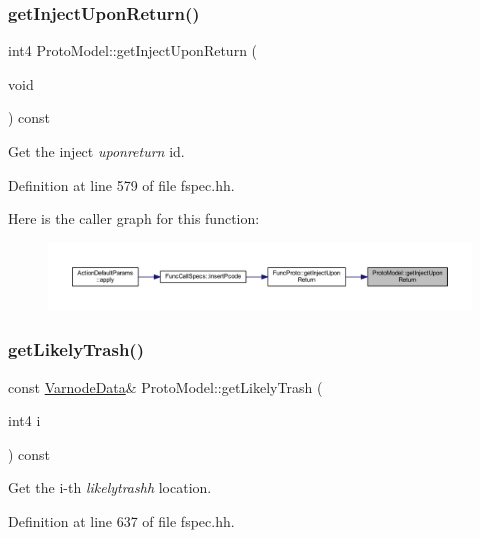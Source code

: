 \subsubsection{\texorpdfstring{getInjectUponReturn()}{getInjectUponReturn()}}
{\footnotesize\ttfamily int4 Proto\+Model\+::get\+Inject\+Upon\+Return (\begin{DoxyParamCaption}\item[{void}]{ }\end{DoxyParamCaption}) const\hspace{0.3cm}{\ttfamily [inline]}}



Get the inject {\itshape uponreturn} id. 



Definition at line 579 of file fspec.\+hh.

Here is the caller graph for this function\+:
\nopagebreak
\begin{figure}[H]
\begin{center}
\leavevmode
\includegraphics[width=350pt]{class_proto_model_a2e8994c68acebcf5c0278d86be39a530_icgraph}
\end{center}
\end{figure}
\mbox{\label{class_proto_model_a1e6449c1c7d16d6ec396d29e58042cad}} 
\subsubsection{\texorpdfstring{getLikelyTrash()}{getLikelyTrash()}}
{\footnotesize\ttfamily const \mbox{\hyperlink{struct_varnode_data}{Varnode\+Data}}\& Proto\+Model\+::get\+Likely\+Trash (\begin{DoxyParamCaption}\item[{int4}]{i }\end{DoxyParamCaption}) const\hspace{0.3cm}{\ttfamily [inline]}}



Get the i-\/th {\itshape likelytrashh} location. 



Definition at line 637 of file fspec.\+hh.

